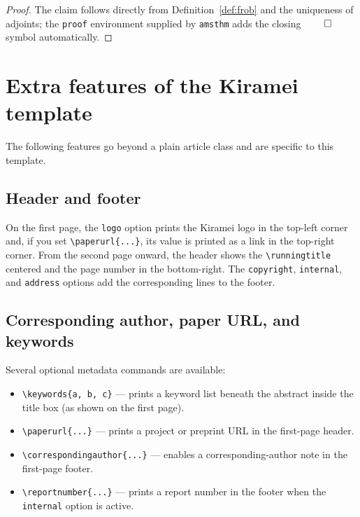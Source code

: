 \documentclass[11pt,letterpaper,twocolumn]{template/style}
\begin{document}
\begin{proof}
The claim follows directly from Definition~\ref{def:frob} and the uniqueness of
adjoints; the \verb+proof+ environment supplied by \verb+amsthm+ adds the closing
$\qed$ symbol automatically.
\end{proof}


\section{Extra features of the Kiramei template}
\label{sec:extras}

The following features go beyond a plain article class and are specific to this
template.

\subsection{Header and footer}
\label{sec:headerfooter}

On the first page, the \verb+logo+ option prints the Kiramei logo in the top-left
corner and, if you set \verb+\paperurl{...}+, its value is printed as a link in
the top-right corner. From the second page onward, the header shows the
\verb+\runningtitle+ centered and the page number in the bottom-right. The
\verb+copyright+, \verb+internal+, and \verb+address+ options add the
corresponding lines to the footer.

\subsection{Corresponding author, paper URL, and keywords}
\label{sec:metadata}

Several optional metadata commands are available:
{\raggedright
\begin{itemize}
  \item \verb+\keywords{a, b, c}+ --- prints a keyword list beneath the abstract
    inside the title box (as shown on the first page).
  \item \verb+\paperurl{...}+ --- prints a project or preprint URL in the
    first-page header.
  \item \verb+\correspondingauthor{...}+ --- enables a corresponding-author note
    in the first-page footer.
  \item \verb+\reportnumber{...}+ --- prints a report number in the footer when
    the \verb+internal+ option is active.
\end{itemize}
\par}
\end{document}
